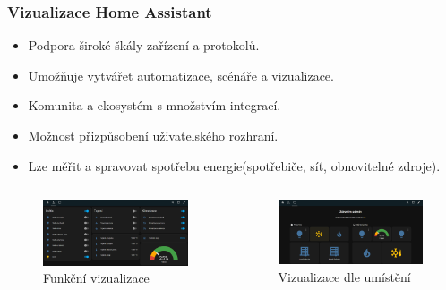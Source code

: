 \documentclass[%
  12pt,       				%
	t,                  %
	aspectratio=1610,   %
	unicode,						%
]{beamer}				    	%
\begin{document}
\begin{frame} 
	\frametitle{Vizualizace Home Assistant}
	\begin{itemize}
		\item Podpora široké škály zařízení a protokolů.
		\item Umožňuje vytvářet automatizace, scénáře a vizualizace.
		\item Komunita a ekosystém s množstvím integrací.
		\item Možnost přizpůsobení uživatelského rozhraní.
		\item Lze měřit a spravovat spotřebu energie(spotřebiče, síť, obnovitelné zdroje).
	\end{itemize}
	\begin{columns}
		\begin{column}{0.5\textwidth}
			\begin{figure} [!ht]	
				\centering
				\includegraphics[width=0.875\columnwidth]{obrazky/Dashboard2.png}
				\caption{Funkční vizualizace}
			\end{figure}
		\end{column}
		\begin{column}{0.5\textwidth}
			\begin{figure} [!ht]	
				\centering
				\includegraphics[width=0.9\columnwidth]{obrazky/Dashboard3.png}
				\caption{Vizualizace dle umístění}
			\end{figure}
		\end{column}
	\end{columns}
\end{frame}
\end{document}
